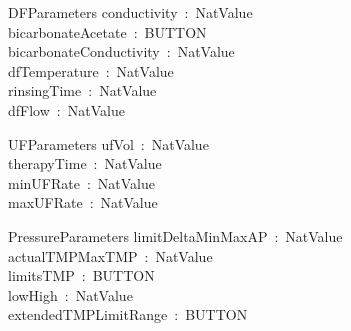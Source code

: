 \begin{schema}{DFParameters}
    conductivity~:~NatValue\\
    bicarbonateAcetate~:~BUTTON\\%
    bicarbonateConductivity~:~NatValue\\
    dfTemperature~:~NatValue\\
    rinsingTime~:~NatValue\\
    dfFlow~:~NatValue\\
\end{schema}

\begin{schema}{UFParameters}
    ufVol~:~NatValue\\
    therapyTime~:~NatValue\\
    minUFRate~:~NatValue\\
    maxUFRate~:~NatValue\\
\end{schema}
\begin{schema}{PressureParameters}
    limitDeltaMinMaxAP~:~NatValue\\
    actualTMPMaxTMP~:~NatValue\\
    limitsTMP~:~BUTTON\\
    lowHigh~:~NatValue\\
    extendedTMPLimitRange~:~BUTTON\\
\end{schema}
